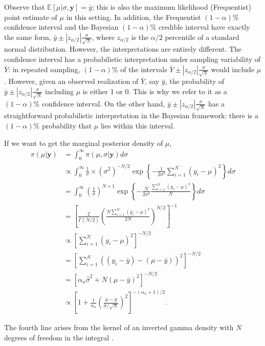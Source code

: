 Observe that $\mathbb{E}[\mu | \sigma, \mathbf{y}] = \bar{y}$; this is also the maximum likelihood (Frequentist) point estimate of $\mu$ in this setting. In addition, the Frequentist $(1-\alpha)\%$ confidence interval and the Bayesian $(1-\alpha)\%$ credible interval have exactly the same form, $\bar{y} \pm |z_{\alpha/2}| \frac{\sigma}{\sqrt{N}}$, where $z_{\alpha/2}$ is the $\alpha/2$ percentile of a standard normal distribution. However, the interpretations are entirely different. The confidence interval has a probabilistic interpretation under sampling variability of $\bar{Y}$: in repeated sampling, $(1-\alpha)\%$ of the intervals $\bar{Y} \pm |z_{\alpha/2}| \frac{\sigma}{\sqrt{N}}$ would include $\mu$. However, given an observed realization of $\bar{Y}$, say $\bar{y}$, the probability of $\bar{y} \pm |z_{\alpha/2}| \frac{\sigma}{\sqrt{N}}$ including $\mu$ is either 1 or 0. This is why we refer to it as a $(1-\alpha)\%$ confidence interval. On the other hand, $\bar{y} \pm |z_{\alpha/2}| \frac{\sigma}{\sqrt{N}}$ has a straightforward probabilistic interpretation in the Bayesian framework: there is a $(1-\alpha)\%$ probability that $\mu$ lies within this interval.

If we want to get the marginal posterior density of $\mu$, 
\begin{align*}
	\pi(\mu|\mathbf{y})&=\int_{0}^{\infty} \pi(\mu,\sigma|\mathbf{y}) d\sigma\\
	&\propto \int_{0}^{\infty} \frac{1}{\sigma}\times (\sigma^2)^{-N/2}\exp\left\{-\frac{1}{2\sigma^2}\sum_{i=1}^N (y_i-\mu)^2\right\} d\sigma\\ 
	&= \int_{0}^{\infty} \left(\frac{1}{\sigma}\right)^{N+1} \exp\left\{-\frac{N}{2\sigma^2}\frac{\sum_{i=1}^N (y_i-\mu)^2}{N}\right\} d\sigma\\
	&=\left[\frac{2}{\Gamma(N/2)}\left(\frac{N\sum_{i=1}^N (y_i-\mu)^2}{2N}\right)^{N/2}\right]^{-1}\\
	&\propto \left[\sum_{i=1}^N (y_i-\mu)^2\right]^{-N/2}\\
	&=\left[\sum_{i=1}^N ((y_i-\bar{y})-(\mu-\bar{y}))^2\right]^{-N/2}\\
	&=[\alpha_n\hat{\sigma}^2+N(\mu-\bar{y})^2]^{-N/2}\\
	&\propto \left[1+\frac{1}{\alpha_n}\left(\frac{\mu-\bar{y}}{\hat{\sigma}/\sqrt{N}}\right)^2\right]^{-(\alpha_n+1)/2}.
\end{align*}

The fourth line arises from the kernel of an inverted gamma density with $N$ degrees of freedom in the integral \cite{zellner1996introduction}.

